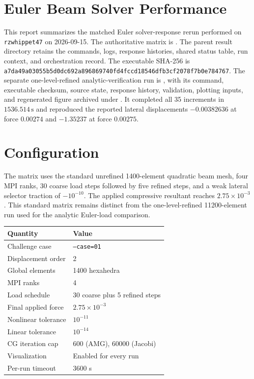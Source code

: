 \documentclass{article}
\begin{document}
\sloppy

\section*{Euler Beam Solver Performance}

This report summarizes the matched Euler solver-response rerun performed on
\texttt{rzwhippet47} on 2026-09-15.  The authoritative matrix is
.
The parent result directory retains the commands, logs, response histories,
shared status table, run context, and orchestration record.  The executable
SHA-256 is
\texttt{a7da49a03055b5d0dc692a896869740fd4fccd18546dfb3cf2078f7b0e784767}.
The separate one-level-refined analytic-verification run is
,
with its command, executable checksum, source state, response history, validation,
plotting inputs, and regenerated figure archived under
.
It completed all 35 increments in $1536.514\,\mathrm{s}$ and reproduced the
reported lateral displacements $-0.00382636$ at force $0.00274$ and $-1.35237$
at force $0.00275$.

\section*{Configuration}

The matrix uses the standard unrefined 1400-element quadratic beam mesh, four MPI
ranks, 30 coarse load steps followed by five refined steps, and a weak lateral
selector traction of $-10^{-10}$.  The applied compressive resultant reaches
$2.75\times10^{-3}$.  This standard matrix remains distinct from the one-level-refined
11200-element run used for the analytic Euler-load comparison.

\begin{center}
\small
\begin{tabular}{@{}ll@{}}
\toprule
Quantity & Value \\
\midrule
Challenge case & \texttt{--case=01} \\
Displacement order & 2 \\
Global elements & 1400 hexahedra \\
MPI ranks & 4 \\
Load schedule & 30 coarse plus 5 refined steps \\
Final applied force & $2.75\times10^{-3}$ \\
Nonlinear tolerance & $10^{-11}$ \\
Linear tolerance & $10^{-14}$ \\
CG iteration cap & 600 (AMG), 60000 (Jacobi) \\
Visualization & Enabled for every run \\
Per-run timeout & 3600 s \\
\bottomrule
\end{tabular}
\end{center}
\end{document}
